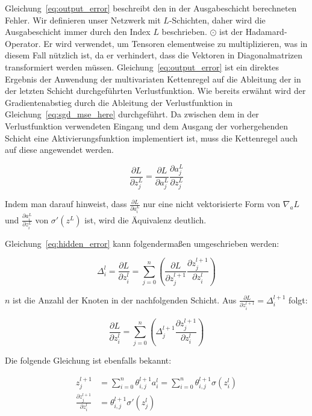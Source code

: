 Gleichung~\eqref{eq:output_error} beschreibt den in der Ausgabeschicht berechneten Fehler. Wir definieren unser Netzwerk mit $L$-Schichten, daher wird die Ausgabeschicht immer durch den Index $L$ beschrieben.
$\odot$ ist der Hadamard-Operator. Er wird verwendet, um Tensoren elementweise zu multiplizieren, was in diesem Fall nützlich ist, da er verhindert, dass die Vektoren in Diagonalmatrizen transformiert werden müssen.
Gleichung~\eqref{eq:output_error} ist ein direktes Ergebnis der Anwendung der multivariaten Kettenregel auf die Ableitung der in der letzten Schicht durchgeführten Verlustfunktion.
Wie bereits erwähnt wird der Gradientenabstieg durch die Ableitung der Verlustfunktion in Gleichung~\eqref{eq:sgd_mse_here} durchgeführt.
Da zwischen dem in der Verlustfunktion verwendeten Eingang und dem Ausgang der vorhergehenden Schicht eine Aktivierungsfunktion implementiert ist, muss die Kettenregel auch auf diese angewendet werden.

\begin{equation}
    \frac{\partial L}{\partial z^L_j} = \frac{\partial L}{\partial a^L_j}\frac{\partial a^L_j}{\partial z^L_j}
    \label{eq:proof_loss_chain_rule}
\end{equation}

Indem man darauf hinweist, dass $\frac{\partial L}{\partial a^L_i}$ nur eine nicht vektorisierte Form von $\nabla_a L$ und $\frac{\partial a^L_i}{\partial z^L_i}$ von $\sigma'(z^L)$ ist, wird die Äquivalenz deutlich.

Gleichung~\eqref{eq:hidden_error} kann folgendermaßen umgeschrieben werden:

\begin{equation}
    \varDelta^l_i = \frac{\partial L}{\partial z^l_i} = \sum_{j=0}^n (\frac{\partial L}{\partial z^{l+1}_j}\frac{\partial z^{l+1}_j}{\partial z^l_i})
\end{equation}

$n$ ist die Anzahl der Knoten in der nachfolgenden Schicht. Aus $\frac{\partial L}{\partial z^{l+1}_i} = \varDelta^{l+1}_i$ folgt:

\begin{equation}
    \frac{\partial L}{\partial z^l_i} = \sum_{j=0}^n (\varDelta^{l+1}_j \frac{\partial z^{l+1}_j}{\partial z^{l}_i})
    \label{eq:hidden_error_intermediate}
\end{equation}

Die folgende Gleichung ist ebenfalls bekannt:

\begin{equation}
    \begin{split}
    z^{l+1}_j & = \sum_{i=0}^n \theta^{l+1}_{i,j} a^l_i = \sum_{i=0}^n \theta^{l+1}_{i, j} \sigma(z^l_i) \\
    \frac{\partial z_j^{l+1}}{\partial z_i^l} & = \theta^{l+1}_{i,j} \sigma'(z^l_j)
    \end{split}
\end{equation}

